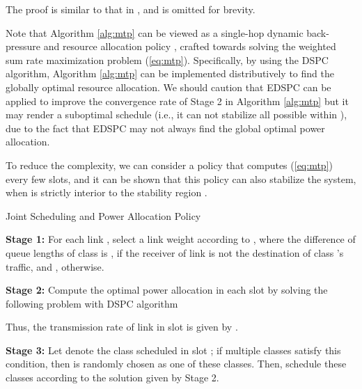 \documentclass[10pt,journal,letterpaper,compsoc]{IEEEtran}
\begin{document}
{{The proof is similar to that in \cite{neely:2005,neely:2006}, and is omitted for brevity.

Note that Algorithm \ref{alg:mtp} can be viewed as a single-hop  dynamic back-pressure and resource allocation policy \cite{neely:2006},
crafted towards solving the weighted sum rate maximization problem (\ref{eq:mtp}). Specifically,
by using the DSPC algorithm, Algorithm \ref{alg:mtp} can be implemented distributively to find the globally optimal resource allocation.
We should caution that EDSPC can be applied to improve the convergence rate of Stage 2 in Algorithm \ref{alg:mtp} but it may render a suboptimal schedule (i.e., it can not stabilize all possible  within ), due to the fact that EDSPC may not always find the global optimal power allocation.

To reduce the complexity, we can consider a policy that computes (\ref{eq:mtp}) every few slots, and it can be shown that this policy can also stabilize the system, when  is strictly interior to the stability region  \cite{sarkar:2008,zhang:2009}.


\begin{algorithm}
\caption{Joint Scheduling and Power Allocation Policy}
\label{alg:mtp}
\begin{algorithmic}
\STATE \textbf{Stage 1:} For each link , select a link weight according to , where the difference of queue lengths of class  is , if the receiver of link  is not the destination of class 's traffic, and  , otherwise.

\STATE \textbf{Stage 2:} Compute the optimal power allocation  in each slot  by solving the following problem with DSPC algorithm

Thus, the transmission rate of link  in slot  is given by .

\STATE \textbf{Stage 3:} Let  denote the class scheduled in slot ; if multiple classes satisfy this condition, then  is randomly chosen as one of these classes. Then, schedule these classes according to the solution given by Stage 2.
\end{algorithmic}
\end{algorithm}

}}
\end{document}
